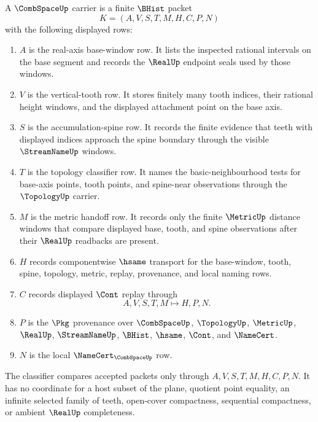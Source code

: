 \begin{definition}
\label{def:comb-space-carrier}
A $\CombSpaceUp$ carrier is a finite $\BHist$ packet
$$
K=(A,V,S,T,M,H,C,P,N)
$$
with the following displayed rows:
\begin{enumerate}
\item $A$ is the real-axis base-window row. It lists the inspected rational intervals on the base segment and records the $\RealUp$ endpoint seals used by those windows.
\item $V$ is the vertical-tooth row. It stores finitely many tooth indices, their rational height windows, and the displayed attachment point on the base axis.
\item $S$ is the accumulation-spine row. It records the finite evidence that teeth with displayed indices approach the spine boundary through the visible $\StreamNameUp$ windows.
\item $T$ is the topology classifier row. It names the basic-neighbourhood tests for base-axis points, tooth points, and spine-near observations through the $\TopologyUp$ carrier.
\item $M$ is the metric handoff row. It records only the finite $\MetricUp$ distance windows that compare displayed base, tooth, and spine observations after their $\RealUp$ readbacks are present.
\item $H$ records componentwise $\hsame$ transport for the base-window, tooth, spine, topology, metric, replay, provenance, and local naming rows.
\item $C$ records displayed $\Cont$ replay through
$$
A,V,S,T,M \longmapsto H,P,N .
$$
\item $P$ is the $\Pkg$ provenance over $\CombSpaceUp$, $\TopologyUp$, $\MetricUp$, $\RealUp$, $\StreamNameUp$, $\BHist$, $\hsame$, $\Cont$, and $\NameCert$.
\item $N$ is the local $\NameCert_{\CombSpaceUp}$ row.
\end{enumerate}
The classifier compares accepted packets only through $A,V,S,T,M,H,C,P,N$. It has no coordinate for a host subset of the plane, quotient point equality, an infinite selected family of teeth, open-cover compactness, sequential compactness, or ambient $\RealUp$ completeness.
\end{definition}

